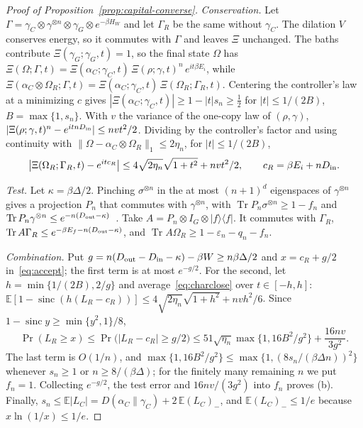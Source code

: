 \documentclass[11pt]{article}
\theoremstyle{definition}
\theoremstyle{remark}
\newcommand{\Tr}{\operatorname{Tr}}
\begin{document}
\begin{proof}[Proof of Proposition~\ref{prop:capital-converse}]
\emph{Conservation.} Let $\Gamma=\gamma_C\otimes\gamma^{\otimes n}\otimes\gamma_G\otimes e^{-\beta H_W}$ and let $\Gamma_R$ be the same without $\gamma_C$. The dilation $V$ conserves energy, so it commutes with $\Gamma$ and leaves $\Xi$ unchanged. The baths contribute $\Xi(\gamma_G;\gamma_G,t)=1$, so the final state $\Omega$ has
$\Xi(\Omega;\Gamma,t)=\Xi(\alpha_C;\gamma_C,t)\,\Xi(\rho;\gamma,t)^n\,e^{it\beta E_i}$, while $\Xi(\alpha_C\otimes\Omega_R;\Gamma,t)=\Xi(\alpha_C;\gamma_C,t)\,\Xi(\Omega_R;\Gamma_R,t)$. Centering the controller's law at a minimizing $c$ gives $|\Xi(\alpha_C;\gamma_C,t)|\ge1-|t|s_n\ge\tfrac12$ for $|t|\le1/(2B)$, $B=\max\{1,s_n\}$. With $v$ the variance of the one-copy law of $(\rho,\gamma)$, $|\Xi(\rho;\gamma,t)^n-e^{itnD_{\rm in}}|\le nvt^2/2$. Dividing by the controller's factor and using continuity with $\|\Omega-\alpha_C\otimes\Omega_R\|_1\le2\eta_n$, for $|t|\le1/(2B)$,
\begin{equation}\label{eq:charclose}
\bigl|\Xi(\Omega_R;\Gamma_R,t)-e^{itc_R}\bigr|\le4\sqrt{2\eta_n}\sqrt{1+t^2}+nvt^2/2,\qquad c_R=\beta E_i+nD_{\rm in}.
\end{equation}

\emph{Test.} Let $\kappa=\beta\Delta/2$. Pinching $\sigma^{\otimes n}$ in the at most $(n+1)^{d}$ eigenspaces of $\gamma^{\otimes n}$ gives a projection $P_n$ that commutes with $\gamma^{\otimes n}$, with $\Tr P_n\sigma^{\otimes n}\ge1-f_n$ and $\Tr P_n\gamma^{\otimes n}\le e^{-n(D_{\rm out}-\kappa)}$~\cite{Hayashi02}. Take $A=P_n\otimes I_G\otimes|f\rangle\langle f|$. It commutes with $\Gamma_R$, $\Tr A\Gamma_R\le e^{-\beta E_f-n(D_{\rm out}-\kappa)}$, and $\Tr A\Omega_R\ge1-\varepsilon_n-q_n-f_n$.

\emph{Combination.} Put $g=n(D_{\rm out}-D_{\rm in}-\kappa)-\beta W\ge n\beta\Delta/2$ and $x=c_R+g/2$ in~\eqref{eq:accept}; the first term is at most $e^{-g/2}$. For the second, let $h=\min\{1/(2B),2/g\}$ and average~\eqref{eq:charclose} over $t\in[-h,h]$: $\mathbb E[1-\operatorname{sinc}(h(L_R-c_R))]\le4\sqrt{2\eta_n}\sqrt{1+h^2}+nvh^2/6$. Since $1-\operatorname{sinc}y\ge\min\{y^2,1\}/8$,
\[
\Pr(L_R\ge x)\le\Pr\bigl(|L_R-c_R|\ge g/2\bigr)\le51\sqrt{\eta_n}\max\{1,16B^2/g^2\}+\frac{16nv}{3g^2}.
\]
The last term is $O(1/n)$, and $\max\{1,16B^2/g^2\}\le\max\{1,(8s_n/(\beta\Delta n))^2\}$ whenever $s_n\ge1$ or $n\ge8/(\beta\Delta)$; for the finitely many remaining $n$ we put $f_n=1$. Collecting $e^{-g/2}$, the test error and $16nv/(3g^2)$ into $f_n$ proves (b). Finally, $s_n\le\mathbb E|L_C|=D(\alpha_C\|\gamma_C)+2\,\mathbb E(L_C)_-$, and $\mathbb E(L_C)_-\le1/e$ because $x\ln(1/x)\le1/e$.


\end{proof}
\end{document}
